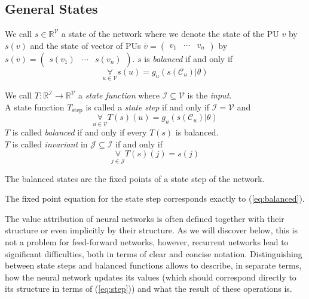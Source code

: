 \documentclass[a4paper,11pt]{article}
\begin{document}
\subsection{General States}
\begin{Def}[States]\label{def:states}
We call $s\in\mathbb{R}^{\mathcal{V}}$ a state of the network where we denote the state of the PU $v$ by $s(v)$ and the state of vector of PUs $\overline{v}=\begin{pmatrix}
v_1&\dotsb&v_n
\end{pmatrix}$ by $s(\overline{v})=\begin{pmatrix}
s(v_1)&\dotsb&s(v_n)
\end{pmatrix}$. $s$ is \emph{balanced} if and only if
\begin{equation}\label{eq:balanced}
\underset{u\in\mathcal{V}}{\forall}s(u)=g_u\left(s\left(\mathcal{C}_u\right)|\theta\right)
\end{equation} 
\end{Def}
\begin{Def}
We call $T:\mathbb{R}^{\mathcal{I}}\to\mathbb{R}^{\mathcal{V}}$ a \emph{state function} where $\mathcal{I}\subseteq\mathcal{V}$ is the \emph{input}.\\
A state function $T_{\text{step}}$ is called a \emph{state step} if and only if $\mathcal{I}=\mathcal{V}$ and 
\begin{equation}\label{eq:step}
\underset{u\in\mathcal{V}}{\forall}T(s)(u)=g_u\left(s(\mathcal{C}_u)|\theta\right)
\end{equation}
$T$ is called \emph{balanced} if and only if every $T(s)$ is balanced.\\
$T$ is called \emph{invariant} in $\mathcal{J}\subseteq\mathcal{I}$ if and only if
\begin{equation}
\underset{j\in\mathcal{J}}{\forall}T(s)(j)=s(j)
\end{equation}
\end{Def}
\begin{Pro}
The balanced states are the fixed points of a state step of the network.
\end{Pro}
\begin{Bew}
The fixed point equation for the state step corresponds exactly to (\ref{eq:balanced}).
\end{Bew}
\begin{Abs}
The value attribution of neural networks is often defined together with their structure or even implicitly by their structure. As we will discover below, this is not a problem for feed-forward networks, however, recurrent networks lead to significant difficulties, both in terms of clear and concise notation. Distinguishing between state steps and balanced functions allows to describe, in separate terms, how the neural network updates its values (which should correspond directly to its structure in terms of (\ref{eq:step})) and what the result of these operations is.
\end{Abs}
\end{document}
